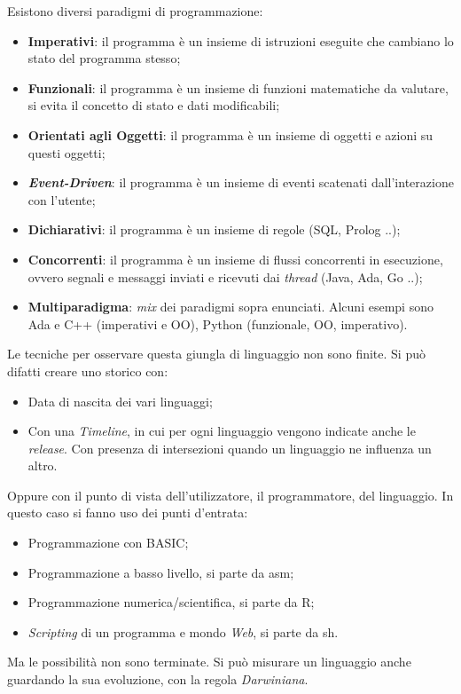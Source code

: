 \documentclass[10pt,a4paper]{book}
\begin{document}
Esistono diversi paradigmi di programmazione:
\begin{itemize}
\item \textbf{Imperativi}: il programma \`e un insieme di istruzioni eseguite  che cambiano lo stato del programma stesso;
\item \textbf{Funzionali}: il programma \`e un insieme di funzioni matematiche da valutare, si evita il concetto di stato e dati modificabili;
\item \textbf{Orientati agli Oggetti}: il programma \`e un insieme di oggetti e azioni su questi oggetti;
\item \textbf{\textit{Event-Driven}}: il programma \`e un insieme di eventi scatenati dall'interazione con l'utente;
\item \textbf{Dichiarativi}: il programma \`e un insieme di regole (SQL, Prolog ..);
\item \textbf{Concorrenti}: il programma \`e un insieme di flussi concorrenti in esecuzione, ovvero segnali e messaggi inviati e ricevuti dai \textit{thread} (Java, Ada, Go ..);
\item \textbf{Multiparadigma}: \textit{mix} dei paradigmi sopra enunciati. Alcuni esempi sono Ada e C++ (imperativi e OO), Python (funzionale, OO, imperativo).
\end{itemize}
\noindent
Le tecniche per osservare questa giungla di linguaggio non sono finite. Si pu\`o difatti creare uno storico con:
\begin{itemize}
\item Data di nascita dei vari linguaggi;
\item Con una \textit{Timeline}, in cui per ogni linguaggio vengono indicate anche le \textit{release}. Con presenza di intersezioni quando un linguaggio ne influenza un altro.
\end{itemize}
\noindent
Oppure con il punto di vista dell'utilizzatore, il programmatore, del linguaggio. In questo caso si fanno uso dei punti d'entrata:
\begin{itemize}
\item Programmazione con BASIC;
\item Programmazione a basso livello, si parte da asm;
\item Programmazione numerica/scientifica, si parte da R;
\item \textit{Scripting} di un programma e mondo \textit{Web}, si parte da sh.
\end{itemize}
\noindent
Ma le possibilit\`a non sono terminate. Si pu\`o misurare un linguaggio anche guardando la sua evoluzione, con la regola \textit{Darwiniana}.
\end{document}
